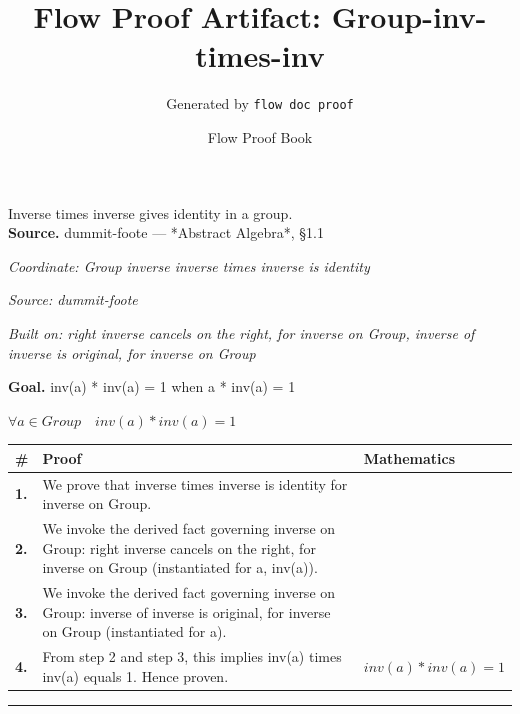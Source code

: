 \documentclass[11pt]{article}
\title{Flow Proof Artifact: Group-inv-times-inv}
\author{Generated by \texttt{flow doc proof}}
\date{Flow Proof Book}
\theoremstyle{definition}
\begin{document}
\maketitle
Inverse times inverse gives identity in a group.\\[0.5em]
\textbf{Source.} dummit-foote — *Abstract Algebra*, §1.1\\[0.5em]
\bigskip
{}\par
\smallskip\noindent\textit{Coordinate: Group \cdot inverse \cdot inverse times inverse is identity}\par
\smallskip\noindent\textit{Source: dummit-foote}\par
\smallskip\noindent\textit{Built on: right inverse cancels on the right, for inverse on Group, inverse of inverse is original, for inverse on Group}\par
\medskip
\noindent\textbf{Goal.} inv(a) * inv(a) = 1 when a * inv(a) = 1\par
\noindent$\displaystyle \forall a \in Group\quad inv(a) * inv(a) = 1$\par
\medskip
\noindent
\begin{tabular}{@{} >{\raggedright\arraybackslash}p{} >{\raggedright\arraybackslash}p{} >{\raggedleft\arraybackslash}p{} @{}}
\textbf{\#} & \textbf{Proof} & \textbf{Mathematics} \\
\midrule
\textbf{1.} & We prove that inverse times inverse is identity for inverse on Group. & \\[0.45em]
\textbf{2.} & We invoke the derived fact governing inverse on Group: right inverse cancels on the right, for inverse on Group (instantiated for a, inv(a)). & \\[0.45em]
\textbf{3.} & We invoke the derived fact governing inverse on Group: inverse of inverse is original, for inverse on Group (instantiated for a). & \\[0.45em]
\textbf{4.} & From step 2 and step 3, this implies inv(a) times inv(a) equals 1. Hence proven. & $\displaystyle inv(a) * inv(a) = 1$ \\[0.45em]
\bottomrule
\end{tabular}
\label{thm:Group-inverse-inverse_times_inverse_is_identity}
\par\medskip\hrule
\end{document}
